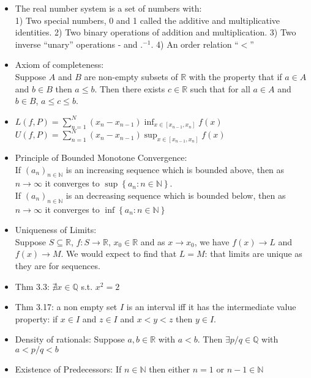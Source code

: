 \documentclass[10pt]{article}
\begin{document}

\begin{multicols}{2}
\begin{itemize}
    \item The real number system is a set of numbers with:\\
    1) Two special numbers, 0 and 1 called the additive and multiplicative identities.
    2) Two binary operations of addition and multiplication.
    3) Two inverse ``unary'' operations - and $.^{-1}$.
    4) An order relation ``$<$''
    \item Axiom of completeness:\\
    Suppose $A$ and $B$ are non-empty subsets of $\mathbb{R}$ with the property that if $a\in A$ and $b\in B$ then $a\leq b$. Then there exists $c\in\mathbb{R}$ such that for all $a\in A$ and $b\in B$, $a\leq c\leq b$.
    \item $L(f,P)=\sum^{N}_{n=1}(x_{n}-x_{n-1})\inf_{x\in[x_{n-1},x_{n}]}f(x)$\\$U(f,P)=\sum^{N}_{n=1}(x_{n}-x_{n-1})\sup_{x\in[x_{n-1},x_{n}]}f(x)$
    \item Principle of Bounded Monotone Convergence:\\
    If $(a_{n})_{n\in\mathbb{N}}$ is an increasing sequence which is bounded above, then as $n\to\infty$ it converges to $\sup\left\{a_{n}:n\in\mathbb{N}\right\}$.\\
    If $(a_{n})_{n\in\mathbb{N}}$ is an decreasing sequence which is bounded below, then as $n\to\infty$ it converges to $\inf\left\{a_{n}:n\in\mathbb{N}\right\}$
    \item Uniqueness of Limits:\\
    Suppose $S\subseteq\mathbb{R}$, $f:S\to\mathbb{R}$, $x_{0}\in\mathbb{R}$ and as $x\to x_{0}$, we have $f(x)\to L$ and $f(x)\to M$. We would expect to find that $L=M$: that limits are unique as they are for sequences.
    \item Thm 3.3: $\nexists x\in\mathbb{Q}$ s.t. $x^{2}=2$
    \item Thm 3.17: a non empty set $I$ is an interval iff it has the intermediate value property: if $x\in I$ and $z\in I$ and $x<y<z$ then $y\in I$.
    \item Density of rationals: Suppose $a,b\in\mathbb{R}$ with $a<b$. Then $\exists p/q\in\mathbb{Q}$ with $a<p/q<b$
    \item Existence of Predecessors: If $n\in\mathbb{N}$ then either $n=1$ or $n-1\in\mathbb{N}$

\end{itemize}
\end{multicols}
\end{document}
